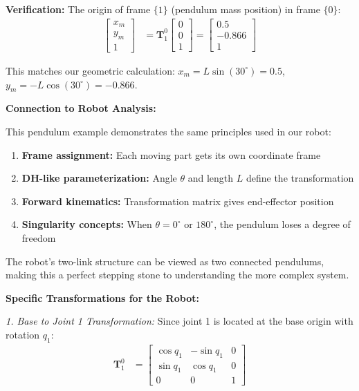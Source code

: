 \documentclass[11pt,a4paper]{article}
\begin{document}
\textbf{Verification:}
The origin of frame $\{1\}$ (pendulum mass position) in frame $\{0\}$:
\begin{align}
\begin{bmatrix} x_m \\ y_m \\ 1 \end{bmatrix} &= \bm{T}_1^0 \begin{bmatrix} 0 \\ 0 \\ 1 \end{bmatrix} = \begin{bmatrix} 0.5 \\ -0.866 \\ 1 \end{bmatrix}
\end{align}

This matches our geometric calculation: $x_m = L\sin(30^{\circ}) = 0.5$, $y_m = -L\cos(30^{\circ}) = -0.866$.

\textbf{Connection to Robot Analysis:}

This pendulum example demonstrates the same principles used in our robot:
\begin{enumerate}
    \item \textbf{Frame assignment:} Each moving part gets its own coordinate frame
    \item \textbf{DH-like parameterization:} Angle $\theta$ and length $L$ define the transformation
    \item \textbf{Forward kinematics:} Transformation matrix gives end-effector position
    \item \textbf{Singularity concepts:} When $\theta = 0^{\circ}$ or $180^{\circ}$, the pendulum loses a degree of freedom
\end{enumerate}

The robot's two-link structure can be viewed as two connected pendulums, making this a perfect stepping stone to understanding the more complex system.

\textbf{Specific Transformations for the Robot:}

\textit{1. Base to Joint 1 Transformation:}
Since joint 1 is located at the base origin with rotation $q_1$:
\begin{align}
\bm{T}_1^0 &= \begin{bmatrix}
\cos q_1 & -\sin q_1 & 0 \\
\sin q_1 & \cos q_1 & 0 \\
0 & 0 & 1
\end{bmatrix}
\end{align}
\end{document}
